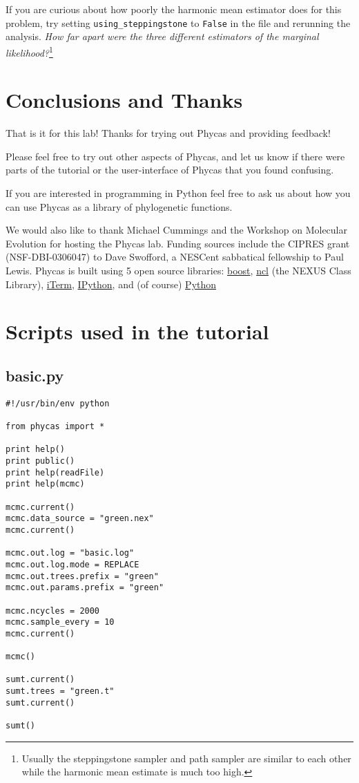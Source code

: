 \documentclass{article}
\newcommand{\cmdopt}[1]{\texttt{#1}\xspace}
\newcommand{\phycas}{Phycas\xspace}
\newcommand{\QandA}[2]{\textit{#1}\footnote{#2}\xspace}
\begin{document}
If you are curious about how poorly the harmonic mean estimator does for this problem, try setting \cmdopt{using\_steppingstone} to \cmdopt{False} in the file and rerunning the analysis. \QandA{How far apart were the three different estimators of the marginal likelihood?}{Usually the steppingstone sampler and path sampler are similar to each other while the harmonic mean estimate is much too high.}

\section{Conclusions and Thanks}
That is it for this lab! Thanks for trying out \phycas and providing feedback!


Please feel free to try out other aspects of \phycas, and let us know if there were
parts of the tutorial or the user-interface of \phycas that
you found confusing.

If you are interested in programming in Python
feel free to ask us about how you can use
\phycas as a library of phylogenetic functions.


We would also like to thank Michael Cummings and the Workshop on Molecular Evolution for hosting the  \phycas lab. Funding sources include the CIPRES grant (NSF-DBI-0306047) to Dave Swofford, a NESCent sabbatical fellowship to Paul Lewis. 
\phycas is built using 5 open source libraries: \href{http://www.boost.org/}{boost}, \href{http://sourceforge.net/projects/ncl/}{ncl} (the NEXUS Class Library),  \href{http://iterm.sourceforge.net/}{iTerm},  \href{http://ipython.scipy.org/moin/}{IPython}, and (of course) \href{http://www.python.org/}{Python}


\newpage
\section{Scripts used in the tutorial}
\subsection{basic.py}\label{basicpy}
\begin{verbatim}
#!/usr/bin/env python

from phycas import *

print help()
print public()
print help(readFile)
print help(mcmc)

mcmc.current()
mcmc.data_source = "green.nex"
mcmc.current()

mcmc.out.log = "basic.log"
mcmc.out.log.mode = REPLACE
mcmc.out.trees.prefix = "green"
mcmc.out.params.prefix = "green"

mcmc.ncycles = 2000 
mcmc.sample_every = 10
mcmc.current()

mcmc()

sumt.current()
sumt.trees = "green.t"
sumt.current()

sumt()
\end{verbatim}
\end{document}
